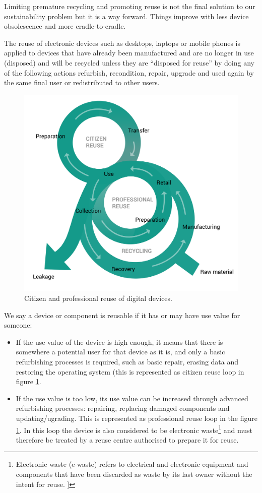 \documentclass[
]{book}
\begin{document}
Limiting premature recycling and promoting reuse is not the final solution to our sustainability problem but it is a way forward. Things improve with less device obsolescence and more cradle-to-cradle.

The reuse of electronic devices such as desktops, laptops or mobile phones is applied to devices that have already been manufactured and are no longer in use (disposed) and will be recycled unless they are ``disposed for reuse'' by doing any of the following actions refurbish, recondition, repair, upgrade and used again by the same final user or redistributed to other users.



\begin{figure}

{\centering \includegraphics[width=0.5\linewidth]{./figs/27-mod1} 

}

\caption{Citizen and professional reuse of digital devices.}\label{fig:ereuseloops}
\end{figure}

We say a device or component is reusable if it has or may have use value for someone:

\begin{itemize}
\item
  If the use value of the device is high enough, it means that there is somewhere a potential user for that device as it is, and only a basic refurbishing processes is required, such as basic repair, erasing data and restoring the operating system (this is represented as citizen reuse loop in figure \ref{fig:ereuseloops}.
\item
  If the use value is too low, its use value can be increased through advanced refurbishing processes: repairing, replacing damaged components and updating/ugrading. This is represented as professional reuse loop in the figure \ref{fig:ereuseloops}. In this loop the device is also considered to be electronic waste\footnote{Electronic waste (e-waste) refers to electrical and electronic equipment and components that have been discarded as waste by its last owner without the intent for reuse. \citep{Comission2012}{]}} and must therefore be treated by a reuse centre authorised to prepare it for reuse.
\end{itemize}
\end{document}

